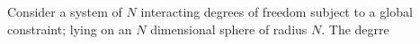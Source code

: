 Consider a system of $N$ interacting degrees of freedom subject to a global constraint; lying on an $N$ dimensional sphere of radius $N$. The degrre